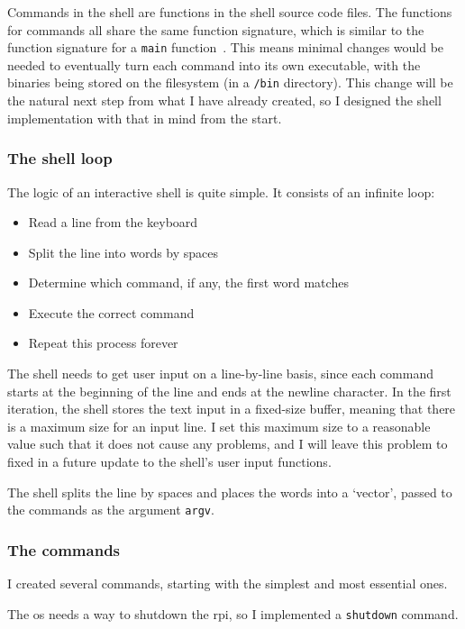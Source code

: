 \documentclass{article}
\begin{document}
Commands in the shell are functions in the shell source code files. The
functions for commands all share the same function signature, which is similar
to the function signature for a \texttt{main} function~\cite{c-main-func}. This
means minimal changes would be needed to eventually turn each command into its
own executable, with the binaries being stored on the filesystem (in a
\texttt{/bin} directory). This change will be the natural next step from what I
have already created, so I designed the shell implementation with that in mind
from the start.

\subsubsection{The shell loop}
The logic of an interactive shell is quite simple. It consists of an infinite
loop:

\begin{itemize}
    \item Read a line from the keyboard
    \item Split the line into words by spaces
    \item Determine which command, if any, the first word matches
    \item Execute the correct command
    \item Repeat this process forever
\end{itemize}

The shell needs to get user input on a line-by-line basis, since each command
starts at the beginning of the line and ends at the newline character. In the
first iteration, the shell stores the text input in a fixed-size buffer,
meaning that there is a maximum size for an input line. I set this maximum size
to a reasonable value such that it does not cause any problems, and I will
leave this problem to fixed in a future update to the shell's user input
functions.

The shell splits the line by spaces and places the words into a `vector',
passed to the commands as the argument \texttt{argv}.

\subsubsection{The commands}
I created several commands, starting with the simplest and most essential
ones.

The \gls{os} needs a way to shutdown the \gls{rpi}, so I implemented a
\texttt{shutdown} command.
\end{document}

